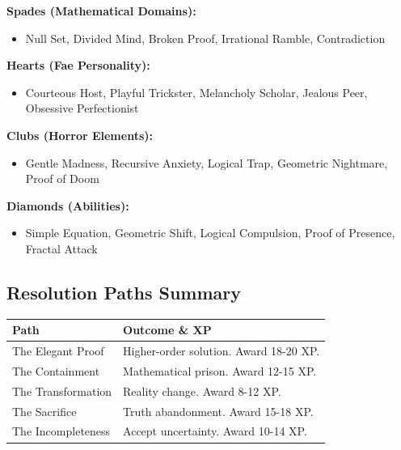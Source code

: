 \documentclass[11pt]{article}
\begin{document}
\textbf{Spades (Mathematical Domains):}
\begin{itemize}
\item Null Set, Divided Mind, Broken Proof, Irrational Ramble, Contradiction
\end{itemize}

\textbf{Hearts (Fae Personality):}
\begin{itemize}
\item Courteous Host, Playful Trickster, Melancholy Scholar, Jealous Peer, Obsessive Perfectionist
\end{itemize}

\textbf{Clubs (Horror Elements):}
\begin{itemize}
\item Gentle Madness, Recursive Anxiety, Logical Trap, Geometric Nightmare, Proof of Doom
\end{itemize}

\textbf{Diamonds (Abilities):}
\begin{itemize}
\item Simple Equation, Geometric Shift, Logical Compulsion, Proof of Presence, Fractal Attack
\end{itemize}

\subsection*{Resolution Paths Summary}

\begin{longtable}{|p{4cm}|p{8cm}|}
\hline
\rowcolor{tableheader}
\textbf{Path} & \textbf{Outcome \& XP} \\
\hline
The Elegant Proof & Higher-order solution. Award 18-20 XP. \\
The Containment & Mathematical prison. Award 12-15 XP. \\
The Transformation & Reality change. Award 8-12 XP. \\
The Sacrifice & Truth abandonment. Award 15-18 XP. \\
The Incompleteness & Accept uncertainty. Award 10-14 XP. \\
\hline
\end{longtable}


\end{document}
